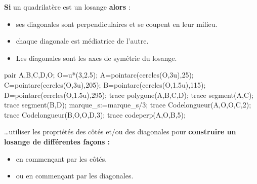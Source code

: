 \begin{changemargin}{-5mm}{-15mm}
    \begin{propriete}[\admise]
        \begin{minipage}{0.6\linewidth}
            \textbf{Si} un quadrilatère est un losange \textbf{alors} :
            \begin{itemize}
                \item ses diagonales sont perpendiculaires et se coupent en leur milieu.
                \item chaque diagonale est médiatrice de l'autre.
                \item Les diagonales sont les axes de symétrie du losange.
            \end{itemize}
        \end{minipage}
        \begin{minipage}{0.4\linewidth}
            \begin{center}
                \begin{Geometrie}
                    pair A,B,C,D,O;
                    O=u*(3,2.5);
                    A=pointarc(cercles(O,3u),25);
                    C=pointarc(cercles(O,3u),205);
                    B=pointarc(cercles(O,1.5u),115);
                    D=pointarc(cercles(O,1.5u),295);
                    trace polygone(A,B,C,D);
                    trace segment(A,C);
                    trace segment(B,D);
                    marque_s:=marque_s/3;
                    trace Codelongueur(A,O,O,C,2);
                    trace Codelongueur(B,O,O,D,3);
                    trace codeperp(A,O,B,5);
                \end{Geometrie}
            \end{center}
        \end{minipage}
    \end{propriete}
    
    \begin{remarque}

        \ldots utiliser les propriétés des côtés et/ou des diagonales pour \textbf{construire un losange de différentes fa\c cons :}
        \begin{itemize}
            \item en commen\c cant par les côtés.
            \item ou en commen\c cant par les diagonales.
        \end{itemize}
    \end{remarque}
    

\end{changemargin}
